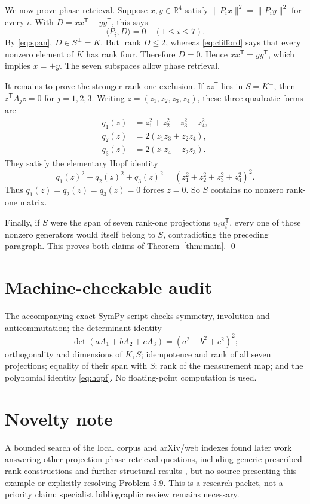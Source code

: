 \documentclass[11pt]{article}
\newcommand{\R}{\mathbb R}
\newcommand{\rank}{\operatorname{rank}}
\begin{document}
We now prove phase retrieval.  Suppose \(x,y\in\R^4\) satisfy
\(\lVert P_i x\rVert^2=\lVert P_i y\rVert^2\) for every \(i\).  With
\(D=xx^{\mathsf T}-yy^{\mathsf T}\), this says
\[
 \langle P_i,D\rangle=0\quad(1\leq i\leq7).
\]
By \eqref{eq:span}, \(D\in S^\perp=K\).  But \(\rank D\leq2\), whereas
\eqref{eq:clifford} says that every nonzero element of \(K\) has rank four.
Therefore \(D=0\).  Hence \(xx^{\mathsf T}=yy^{\mathsf T}\), which implies
\(x=\pm y\).  The seven subspaces allow phase retrieval.

It remains to prove the stronger rank-one exclusion.  If \(zz^{\mathsf T}\)
lies in \(S=K^\perp\), then
\(z^{\mathsf T}A_jz=0\) for \(j=1,2,3\).  Writing
\(z=(z_1,z_2,z_3,z_4)\), these three quadratic forms are
\begin{align*}
 q_1(z)&=z_1^2+z_2^2-z_3^2-z_4^2,\\
 q_2(z)&=2(z_1z_3+z_2z_4),\\
 q_3(z)&=2(z_1z_4-z_2z_3).
\end{align*}
They satisfy the elementary Hopf identity
\begin{equation}\label{eq:hopf}
 q_1(z)^2+q_2(z)^2+q_3(z)^2
   =(z_1^2+z_2^2+z_3^2+z_4^2)^2.
\end{equation}
Thus \(q_1(z)=q_2(z)=q_3(z)=0\) forces \(z=0\).  So \(S\) contains no
nonzero rank-one matrix.

Finally, if \(S\) were the span of seven rank-one projections
\(u_i u_i^{\mathsf T}\), every one of those nonzero generators would itself
belong to \(S\), contradicting the preceding paragraph.  This proves both
claims of Theorem~\ref{thm:main}. \qed

\section*{Machine-checkable audit}

The accompanying exact SymPy script checks symmetry, involution and
anticommutation; the determinant identity
\[
 \det(aA_1+bA_2+cA_3)=(a^2+b^2+c^2)^2;
\]
orthogonality and dimensions of \(K,S\); idempotence and rank of all seven
projections; equality of their span with \(S\); rank of the measurement map;
and the polynomial identity \eqref{eq:hopf}.  No floating-point computation
is used.

\section*{Novelty note}

A bounded search of the local corpus and arXiv/web indexes found later work
answering other projection-phase-retrieval questions, including generic
prescribed-rank constructions \cite{Edidin} and further structural results
\cite{CCJW}, but no source presenting this example or explicitly resolving
Problem 5.9.  This is a research packet, not a priority claim; specialist
bibliographic review remains necessary.
\end{document}
